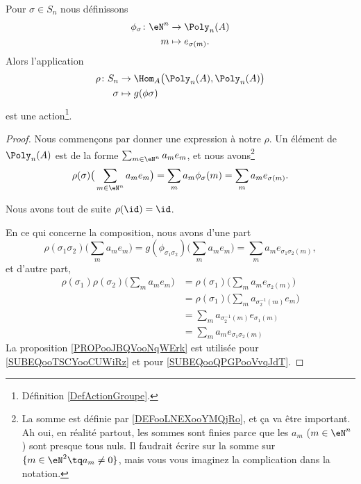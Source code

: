 \begin{lemma}       \label{LEMooIRVQooHvoNBq}
    Pour \( \sigma\in S_n\) nous définissons 
    \begin{equation}
        \begin{aligned}
            \phi_{\sigma}\colon \eN^n&\to \Poly_n(A) \\
            m&\mapsto e_{\sigma(m)}. 
        \end{aligned}
    \end{equation}
    Alors l'application
    \begin{equation}
        \begin{aligned}
            \rho\colon S_n&\to \Hom_A\big( \Poly_n(A),\Poly_n(A) \big) \\
            \sigma&\mapsto g(\phi{\sigma}) 
        \end{aligned}
    \end{equation}
    est une action\footnote{Définition \ref{DefActionGroupe}.}.
\end{lemma}

\begin{proof}
    Nous commençons par donner une expression à notre \( \rho\). Un élément de \( \Poly_n(A)\) est de la forme \( \sum_{m\in \eN^n}a_me_m\), et nous avons\footnote{La somme est définie par \ref{DEFooLNEXooYMQjRo}, et ça va être important. Ah oui, en réalité partout, les sommes sont finies parce que les \( a_m\) (\( m\in \eN^n\)) sont presque tous nuls. Il faudrait écrire sur la somme sur \(\{ m\in \eN^2\tq a_m\neq 0 \}\), mais vous vous imaginez la complication dans la notation.}
    \begin{equation}
        \rho(\sigma)\big( \sum_{m\in \eN^n}a_me_m \big)=\sum_ma_m\phi_{\sigma}(m)=\sum_ma_me_{\sigma(m)}.
    \end{equation}
    
    Nous avons tout de suite \( \rho(\id)=\id\).

    En ce qui concerne la composition, nous avons d'une part
    \begin{equation}
        \rho(\sigma_1\sigma_2)\big( \sum_ma_me_m \big)=g(\phi_{\sigma_1\sigma_2})\big( \sum_ma_me_m \big)=\sum_ma_me_{\sigma_1\sigma_2(m)},
    \end{equation}
    et d'autre part,
    \begin{subequations}
        \begin{align}
            \rho(\sigma_1)\rho(\sigma_2)\big( \sum_ma_me_m \big)&=\rho(\sigma_1)\big( \sum_ma_me_{\sigma_2(m)} \big)\\
            &=\rho(\sigma_1)\big( \sum_ma_{\sigma_2^{-1}(m)}e_m \big)   \label{SUBEQooTSCYooCUWiRz}\\
            &=\sum_ma_{\sigma_2^{-1}(m)}e_{\sigma_1(m)}\\
            &=\sum_ma_me_{\sigma_1\sigma_2(m)}      \label{SUBEQooQPGPooVvqJdT}
        \end{align}
    \end{subequations}
    La proposition \ref{PROPooJBQVooNqWErk} est utilisée pour \eqref{SUBEQooTSCYooCUWiRz} et pour \eqref{SUBEQooQPGPooVvqJdT}.
\end{proof}

